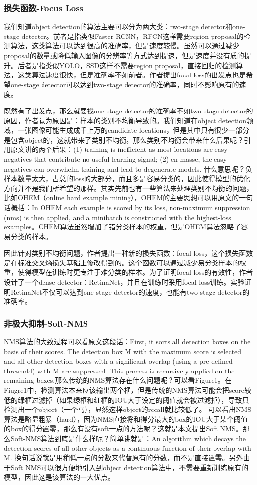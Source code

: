 \subsubsection{损失函数-Focus Loss}
我们知道object detection的算法主要可以分为两大类：two-stage detector和one-stage detector。前者是指类似Faster RCNN，RFCN这样需要region proposal的检测算法，这类算法可以达到很高的准确率，但是速度较慢。虽然可以通过减少proposal的数量或降低输入图像的分辨率等方式达到提速，但是速度并没有质的提升。后者是指类似YOLO，SSD这样不需要region proposal，直接回归的检测算法，这类算法速度很快，但是准确率不如前者。作者提出focal loss的出发点也是希望one-stage detector可以达到two-stage detector的准确率，同时不影响原有的速度。

既然有了出发点，那么就要找one-stage detector的准确率不如two-stage detector的原因，作者认为原因是：样本的类别不均衡导致的。我们知道在object detection领域，一张图像可能生成成千上万的candidate locations，但是其中只有很少一部分是包含object的，这就带来了类别不均衡。那么类别不均衡会带来什么后果呢？引用原文讲的两个后果：(1) training is inefficient as most locations are easy negatives that contribute no useful learning signal; (2) en masse, the easy negatives can overwhelm training and lead to degenerate models. 什么意思呢？负样本数量太大，占总的loss的大部分，而且多是容易分类的，因此使得模型的优化方向并不是我们所希望的那样。其实先前也有一些算法来处理类别不均衡的问题，比如OHEM（online hard example mining），OHEM的主要思想可以用原文的一句话概括：In OHEM each example is scored by its loss, non-maximum suppression (nms) is then applied, and a minibatch is constructed with the highest-loss examples。OHEM算法虽然增加了错分类样本的权重，但是OHEM算法忽略了容易分类的样本。

因此针对类别不均衡问题，作者提出一种新的损失函数：focal loss，这个损失函数是在标准交叉熵损失基础上修改得到的。这个函数可以通过减少易分类样本的权重，使得模型在训练时更专注于难分类的样本。为了证明focal loss的有效性，作者设计了一个dense detector：RetinaNet，并且在训练时采用focal loss训练。实验证明RetinaNet不仅可以达到one-stage detector的速度，也能有two-stage detector的准确率。
\subsubsection{非极大抑制-Soft-NMS}
NMS算法的大致过程可以看原文这段话：First, it sorts all detection boxes on the basis of their scores. The detection box M with the maximum score is selected and all other detection boxes with a significant overlap (using a pre-defined threshold) with M are suppressed. This process is recursively applied on the remaining boxes.那么传统的NMS算法存在什么问题呢？可以看Figure1。在Fiugre1中，检测算法本来应该输出两个框，但是传统的NMS算法可能会把score较低的绿框过滤掉（如果绿框和红框的IOU大于设定的阈值就会被过滤掉），导致只检测出一个object（一个马），显然这样object的recall就比较低了。 
可以看出NMS算法是略显粗暴（hard），因为NMS直接将和得分最大的box的IOU大于某个阈值的box的得分置零，那么有没有soft一点的方法呢？这就是本文提出Soft NMS。那么Soft-NMS算法到底是什么样呢？简单讲就是：An algorithm which decays the detection scores of all other objects as a continuous function of their overlap with M. 换句话说就是用稍低一点的分数来代替原有的分数，而不是直接置零。另外由于Soft NMS可以很方便地引入到object detection算法中，不需要重新训练原有的模型，因此这是该算法的一大优点。
